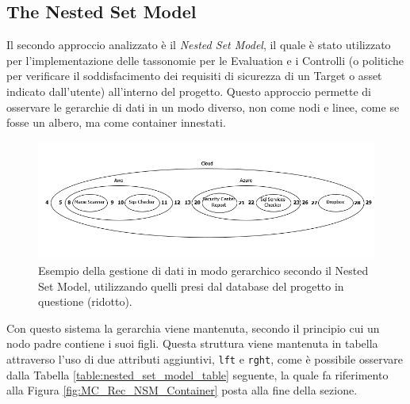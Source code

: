 \subsection{The Nested Set Model}
Il secondo approccio analizzato è il \textit{Nested Set Model}, il quale è stato utilizzato per l'implementazione delle tassonomie per le Evaluation e 
i Controlli (o politiche per verificare il soddisfacimento dei requisiti di sicurezza di un Target o asset indicato dall'utente) all'interno del progetto.\hfill\break
Questo approccio permette di osservare le gerarchie di dati in un modo diverso, non come nodi e linee, come se fosse un albero, ma come container innestati.
%
\begin{figure}[ht!]
    \includegraphics[scale=0.6]{images/MC_Rec_NSM_Container(R).png}
    \caption{Esempio della gestione di dati in modo gerarchico secondo il Nested Set Model, utilizzando quelli presi dal database del 
    progetto in questione (ridotto).}
    \label{fig:MC_Rec_NSM_Container_R}
\end{figure}
\hfill\break
%
Con questo sistema la gerarchia viene mantenuta, secondo il principio cui un nodo padre contiene i suoi figli. Questa struttura 
viene mantenuta in tabella attraverso l'uso di due attributi aggiuntivi, \texttt{lft} e \texttt{rght}, come è possibile osservare 
dalla Tabella \ref{table:nested_set_model_table} seguente, la quale fa riferimento alla Figura \ref{fig:MC_Rec_NSM_Container} 
posta alla fine della sezione.
%
\newpage
%
